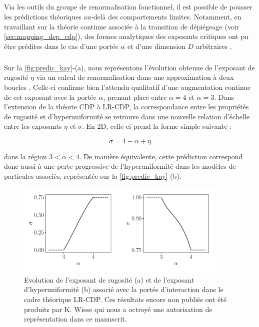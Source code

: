 \subparagraph{}Via les outils du groupe de renormalisation fonctionnel, il est possible de pousser les prédictions théoriques au-delà des comportements limites. Notamment, en travaillant sur la théorie continue associée à la transition de dépiégeage (voir \autoref{sec:mapping_dep_cdp}), des formes analytiques des exposants critiques ont pu être prédites dans le cas d'une portée $\alpha$ et d'une dimension $D$ arbitraires \cite{wiese_theory_2022, wiese_longrange}. 

\subparagraph{}Sur la \autoref{fig:predic_kay}-(a), nous représentons l'évolution obtenue de l'exposant de rugosité $\eta$ via un calcul de renormalisation dans une approximation à deux boucles \cite{wiese_longrange}. Celle-ci confirme bien l'attendu qualitatif d'une augmentation continue de cet exposant avec la portée $\alpha$, prenant place entre $\alpha = 4$ et $\alpha = 3$. Dans l'extension de la théorie CDP à LR-CDP, la correspondance entre les propriétés de rugosité et d'hyperuniformité se retrouve dans une nouvelle relation d'échelle entre les exposants $\eta$ et $\sigma$. En 2D, celle-ci prend la forme simple suivante :

\begin{equation}
	\sigma = 4 - \alpha + \eta
\end{equation}

\noindent dans la région $3<\alpha < 4$. De manière équivalente, cette prédiction correspond donc aussi à une perte progressive de l'hyperuniformité dans les modèles de particules associés, représentée sur la \autoref{fig:predic_kay}-(b).

\begin{figure}[h]
	\centering
	\includegraphics[width=0.9\textwidth]{Chapitre2/Figures/eta_kay.pdf}
	\caption{Evolution de l'exposant de rugosité (a) et de l'exposant d'hyperuniformité (b) associé avec la portée d'interaction dans le cadre théorique LR-CDP. Ces résultats encore non publiés ont été produits par K. Wiese qui nous a octroyé une autorisation de représentation dans ce manuscrit.}
	\label{fig:predic_kay}
\end{figure}


